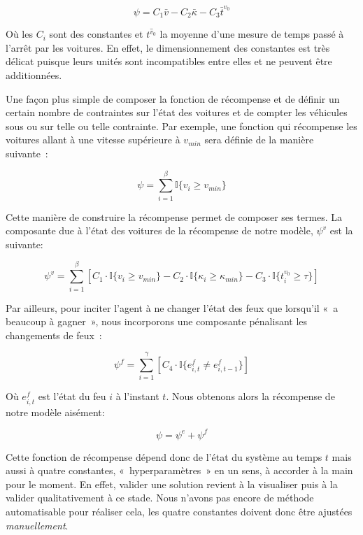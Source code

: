 \documentclass[11pt]{article}
\begin{document}
$$\psi = C_1\bar{v} - C_2\bar{\kappa} - C_3\bar{t}^{v_0}$$

Où les \(C_i\) sont des constantes et \(\bar{t^{v_0}}\) la moyenne d'une mesure de temps passé à l'arrêt par les voitures. En effet, le dimensionnement des constantes est très délicat puisque leurs unités sont incompatibles entre elles et ne peuvent être additionnées.

Une façon plus simple de composer la fonction de récompense et de définir un certain nombre de contraintes sur l'état des voitures et de compter les véhicules sous ou sur telle ou telle contrainte. Par exemple, une fonction qui récompense les voitures allant à une vitesse supérieure à \(v_{min}\) sera définie de la manière suivante :

$$\psi = \sum^{\beta}_{i=1}\mathbb{I}\{v_i \geq v_{min}\}$$

Cette manière de construire la récompense permet de composer ses termes. La composante due à l'état des voitures de la récompense de notre modèle, \(\psi^v\) est la suivante:

\begin{latex}
\begin{equation}
  \psi^v = \sum^{\beta}_{i=1}\left[
    C_1 \cdot \mathbb{I}\{v_i \geq v_{min}\}
    - C_2 \cdot \mathbb{I}\{\kappa_i \geq \kappa_{min}\}
    - C_3 \cdot \mathbb{I}\{t^{v_0}_i \geq \tau\}
  \right]
\end{equation}
\end{latex}

Par ailleurs, pour inciter l'agent à ne changer l'état des feux que lorsqu'il « a beaucoup à gagner », nous incorporons une composante pénalisant les changements de feux :

\begin{latex}
\begin{equation}
  \psi^f = \sum^{\gamma}_{i=1}\left[
    C_4 \cdot \mathbb{I}\{e^f_{i, t} \neq e^f_{i, t-1}\}
  \right]
\end{equation}
\end{latex}

Où \(e^f_{i, t}\) est l'état du feu \(i\) à l'instant \(t\). Nous obtenons alors la récompense de notre modèle aisément:

\begin{latex}
\begin{equation}
  \psi = \psi^e + \psi^f
\end{equation}
\end{latex}

Cette fonction de récompense dépend donc de l'état du système au temps \(t\) mais aussi à quatre constantes, « hyperparamètres » en un sens, à accorder à la main pour le moment. En effet, valider une solution revient à la visualiser puis à la valider qualitativement à ce stade. Nous n'avons pas encore de méthode automatisable pour réaliser cela, les quatre constantes doivent donc être ajustées \emph{manuellement}.
\end{document}
